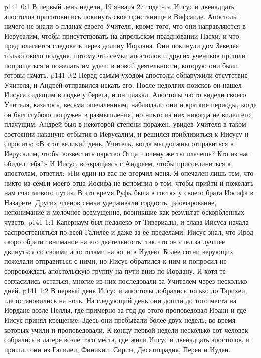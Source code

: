 \author{Комиссия срединников}
\vs p141 0:1 В первый день недели, 19 января 27 года н.э. Иисус и двенадцать апостолов приготовились покинуть свое пристанище в Вифсаиде. Апостолы ничего не знали о планах своего Учителя, кроме того, что они направляются в Иерусалим, чтобы присутствовать на апрельском праздновании Пасхи, и что предполагается следовать через долину Иордана. Они покинули дом Зеведея только около полудня, потому что семьи апостолов и других учеников пришли попрощаться и пожелать им удачи в новой деятельности, которую они были готовы начать.
\vs p141 0:2 Перед самым уходом апостолы обнаружили отсутствие Учителя, и Андрей отправился искать его. После недолгих поисков он нашел Иисуса сидящим в лодке у берега, и он плакал. Апостолы часто видели своего Учителя, казалось, весьма опечаленным, наблюдали они и краткие периоды, когда он был глубоко погружен в размышления, но никто из них никогда не видел его плачущим. Андрей был в некоторой степени поражен, увидев Учителя в таком состоянии накануне отбытия в Иерусалим, и решился приблизиться к Иисусу и спросить: «В этот великий день, Учитель, когда мы должны отправиться в Иерусалим, чтобы возвестить царство Отца, почему же ты плачешь? Кто из нас обидел тебя?» И Иисус, возвращаясь с Андреем, чтобы присоединиться к апостолам, ответил: «Ни один из вас не огорчил меня. Я опечален лишь тем, что никто из семьи моего отца Иосифа не вспомнил о том, чтобы прийти и пожелать нам счастливого пути». В это время Руфь была в гостях у своего брата Иосифа в Назарете. Других членов семьи удерживали гордость, разочарование, непонимание и мелочное возмущение, возникшие как результат оскорбленных чувств.
\vs p141 1:1 Капернаум был недалеко от Тивериады, и слава Иисуса начала распространяться по всей Галилее и даже за ее пределами. Иисус знал, что Ирод скоро обратит внимание на его деятельность; так что он счел за лучшее двинуться со своими апостолами на юг и в Иудею. Более сотни верующих пожелали отправиться с ними, но Иисус обратился к ним и попросил не сопровождать апостольскую группу на пути вниз по Иордану. И хотя те согласились остаться, многие из них последовали за Учителем через несколько дней.
\vs p141 1:2 В первый день Иисус и апостолы добрались только до Тарихеи, где остановились на ночь. На следующий день они дошли до того места на Иордане возле Пеллы, где примерно за год до этого проповедовал Иоанн и где Иисус принял крещение. Здесь они пребывали более двух недель, во время которых учили и проповедовали. К концу первой недели несколько сот человек собрались в лагере возле того места, где жили Иисус и двенадцать апостолов, и пришли они из Галилеи, Финикии, Сирии, Десятиградия, Переи и Иудеи.

